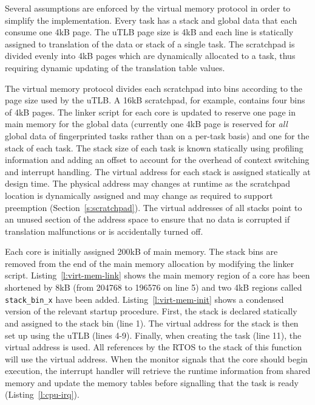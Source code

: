 	Several assumptions are enforced by the virtual memory protocol in order to simplify the implementation. 
	Every task has a stack and global data that each consume one 4kB page.
	The uTLB page size is 4kB and each line is statically assigned to translation of the data or stack of a single task.
	The scratchpad is divided evenly into 4kB pages which are dynamically allocated to a task, thus requiring dynamic updating of the translation table values.

	
	The virtual memory protocol divides each scratchpad into bins according to the page size used by the uTLB. 
	A 16kB scratchpad, for example, contains four bins of 4kB pages.  
	The linker script for each core is updated to reserve one page in main memory for the global data (currently one 4kB page is reserved for \emph{all} global data of fingerprinted tasks rather than on a per-task basis) and one for the stack of each task. 
	The stack size of each task is known statically using profiling information and adding an offset to account for the overhead of context switching and interrupt handling. 
	The virtual address for each stack is assigned statically at design time. 
	The physical address may changes at runtime as the scratchpad location is dynamically assigned and may change as required to support preemption (Section~\ref{s:scratchpad}). 
	The virtual addresses of all stacks point to an unused section of the address space to ensure that no data is corrupted if translation malfunctions or is accidentally turned off.
	
	Each core is initially assigned 200kB of main memory. 
	The stack bins are removed from the end of the main memory allocation by modifying the linker script.
	Listing~\ref{l:virt-mem-link} shows the main memory region of a core has been shortened by 8kB (from 204768 to 196576 on line 5) and two 4kB regions called \texttt{stack\_bin\_x} have been added. 
	Listing~\ref{l:virt-mem-init} shows a condensed version of the relevant startup procedure. 
	First, the stack is declared statically and assigned to the stack bin (line 1). 
	The virtual address for the stack is then set up using the uTLB (lines 4-9). 
	Finally, when creating the task (line 11), the virtual address is used. 
	All references by the RTOS to the stack of this function will use the virtual address. 
	When the monitor signals that the core should begin execution, the interrupt handler will retrieve the runtime information from shared memory and update the memory tables before signalling that the task is ready (Listing~\ref{l:cpu-irq}).


